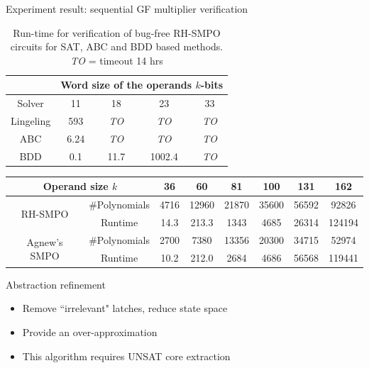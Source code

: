 \documentclass[xcolor=dvipsnames]{beamer}
\newcommand{\bi}{\begin{itemize}}
\newcommand{\ei}{\end{itemize}}
\begin{document}
\begin{frame}{\large{Experiment result: sequential GF multiplier verification}}
\begin{table}[H]
\centering
\caption{\small Run-time for verification of bug-free RH-SMPO circuits
  for SAT, ABC and BDD based methods. \emph{TO} = timeout 14 hrs}
\label{tbl:equiv}
\begin{tabular}{|c||c|c|c|c|} 
\hline
& \multicolumn{4}{|c|}{Word size of the operands $k$-bits}  \\
\hline
Solver & 11 & 18 & 23 & 33 \\
\hline
\hline
Lingeling & 593  & \emph{TO}  & \emph{TO}  & \emph{TO}\\
\hline
\hline
ABC & 6.24 & \emph{TO} & \emph{TO} & \emph{TO}\\
\hline
\hline
BDD & 0.1 & 11.7 & 1002.4 & \emph{TO}  \\
\hline
\end{tabular}
\label{table:satbdd}  
\end{table} 
\begin{table}[H]
\centering
\label{tab:Cpp}
{\small 
\begin{tabular}{|c|c||c|c|c|c|c|c|}
\hline
\multicolumn{2}{|c||}{\centering Operand size $k$} & 36 & 60 & 81 & 100 & 131 & 162 \\
\hline
\multirow{2}{1.5cm}{\centering RH-SMPO} & \#Polynomials & 4716 & 12960 & 21870 & 35600 & 56592 & 92826 \\
\cline{2-8}
 & Runtime & 14.3 & 213.3 & 1343 & 4685 & 26314 & 124194 \\
\hline
\multirow{2}{1.5cm}{\centering Agnew's SMPO} & \#Polynomials & 2700 & 7380 & 13356 & 20300 & 34715 & 52974 \\
\cline{2-8}
 & Runtime & 10.2 & 212.0 & 2684 & 4686 & 56568 & 119441 \\
 
 \hline

\end{tabular}
}
\end{table}
\end{frame}
\begin{frame}[label = refine]{\large{Abstraction refinement}}
\begin{figure}[hbt]
\end{figure}
\bi
\item Remove ``irrelevant" latches, reduce state space
\item Provide an over-approximation
\item This algorithm requires \alert{UNSAT core extraction}
\ei
\hyperlink{motiv3}{}
\end{frame}
\end{document}
